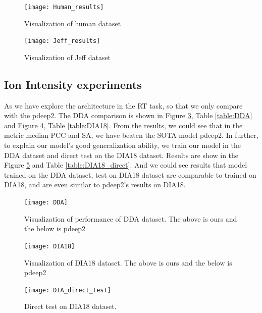 \documentclass[final]{cvpr}
\begin{document}
\begin{figure}[t]

   \texttt{[image: Human\_results]}

   \caption{Visualization of human dataset}
\label{fig:Human_results}
\end{figure}

\begin{figure}[t]

   \texttt{[image: Jeff\_results]}

   \caption{Visualization of Jeff dataset}
\label{fig:Jeff_results}
\end{figure}

\subsection{Ion Intensity experiments}
As we have explore the architecture in the RT task, so that we only compare with the pdeep2.
The DDA comparison is shown in Figure \ref{fig:DDA}, Table \ref{table:DDA} and Figure \ref{fig:DIA18},
Table \ref{table:DIA18}.
From the results, we could see that in the metric median PCC and SA, we have beaten the SOTA model
pdeep2. In further, to explain our model's good generalization ability, we train our model in the DDA 
dataset and direct test on the DIA18 dataset. Results are show in the Figure \ref{fig:DIA18_direct} and Table \ref{table:DIA18_direct}.
And we could see results that model trained on the DDA dataset, test on DIA18 dataset are comparable to trained
on DIA18, and are even similar to pdeep2's results on DIA18.

\begin{figure}[t]

   \texttt{[image: DDA]}

   \caption{Visualization of performance of DDA dataset. The above is ours and the below is pdeep2}
\label{fig:DDA}
\end{figure}


\begin{figure}[t]

   \texttt{[image: DIA18]}

   \caption{Visualization of DIA18 dataset.  The above is ours and the below is pdeep2}
\label{fig:DIA18}
\end{figure}


\begin{figure}[t]

   \texttt{[image: DIA\_direct\_test]}

   \caption{Direct test on DIA18 dataset.}
\label{fig:DIA18_direct}
\end{figure}
\end{document}
